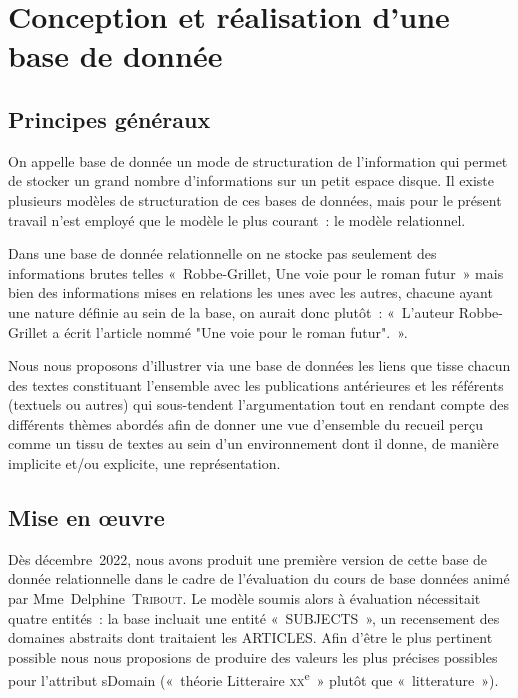 \documentclass[12pt, a4paper]{article}
\begin{document}
\section{Conception et réalisation d'une base de donnée}
    \subsection{Principes généraux}
    On appelle base de donnée un mode de structuration de l'information qui permet de stocker un grand nombre d'informations sur un petit espace disque. Il existe plusieurs modèles de structuration de ces bases de données, mais pour le présent travail n'est employé que le modèle le plus courant~: le modèle relationnel.

    Dans une base de donnée relationnelle on ne stocke pas seulement des informations brutes telles «~Robbe-Grillet, Une voie pour le roman futur~» mais bien des informations mises en relations les unes avec les autres, chacune ayant une nature définie au sein de la base, on aurait donc plutôt~: «~L'auteur Robbe-Grillet a écrit l'article nommé "Une voie pour le roman futur".~».

    Nous nous proposons d'illustrer via une base de données les liens que tisse chacun des textes constituant l'ensemble avec les publications antérieures et les référents (textuels ou autres) qui sous-tendent l'argumentation tout en rendant compte des différents thèmes abordés afin de donner une vue d'ensemble du recueil perçu comme un tissu de textes au sein d'un environnement dont il donne, de manière implicite et/ou explicite, une représentation.


   




    \subsection{Mise en œuvre}

    Dès décembre~2022, nous avons produit une première version de cette base de donnée relationnelle dans le cadre de l'évaluation du cours de base données animé par Mme~Delphine~\textsc{Tribout}. Le modèle soumis alors à évaluation nécessitait quatre entités~: la base incluait une entité «~SUBJECTS~», un recensement des domaines abstraits dont traitaient les ARTICLES. Afin d'être le plus pertinent possible nous nous proposions de produire des valeurs les plus précises possibles pour l'attribut sDomain («~théorie Litteraire \textsc{xx}\textsuperscript{e}~» plutôt que «~litterature~»).
\end{document}
